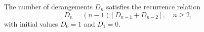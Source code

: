 The number of derangements $D_n$ satisfies the recurrence relation
$$D_n = (n-1)\left[D_{n-1} + D_{n-2}\right], \quad n \geq 2,$$
with initial values $D_0 = 1$ and $D_1 = 0$.
